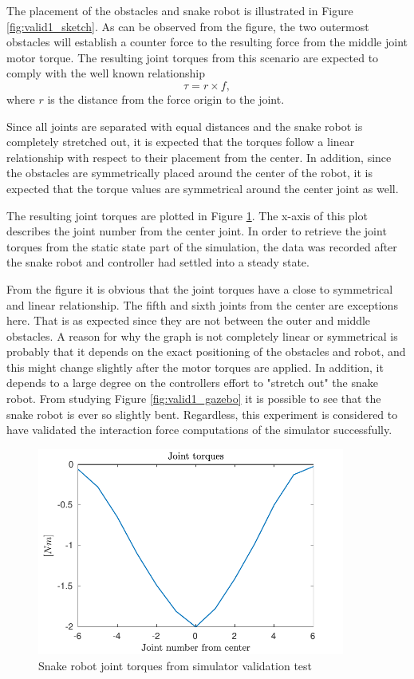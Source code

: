 The placement of the obstacles and snake robot is illustrated in Figure \ref{fig:valid1_sketch}. As can be observed from the figure, the two outermost obstacles will establish a counter force to the resulting force from the middle joint motor torque. The resulting joint torques from this scenario are expected to comply with the well known relationship
\begin{equation}
    \tau = r\times f,
\end{equation}
where $r$ is the distance from the force origin to the joint.

Since all joints are separated with equal distances and the snake robot is completely stretched out, it is expected that the torques follow a linear relationship with respect to their placement from the center. In addition, since the obstacles are symmetrically placed around the center of the robot, it is expected that the torque values are symmetrical around the center joint as well.

The resulting joint torques are plotted in Figure \ref{fig:validation1}. The x-axis of this plot describes the joint number from the center joint. In order to retrieve the joint torques from the static state part of the simulation, the data was recorded after the snake robot and controller had settled into a steady state.

From the figure it is obvious that the joint torques have a close to symmetrical and linear relationship. The fifth and sixth joints from the center are exceptions here. That is as expected since they are not between the outer and middle obstacles. A reason for why the graph is not completely linear or symmetrical is probably that it depends on the exact positioning of the obstacles and robot, and this might change slightly after the motor torques are applied. In addition, it depends to a large degree on the controllers effort to "stretch out" the snake robot. From studying Figure \ref{fig:valid1_gazebo} it is possible to see that the snake robot is ever so slightly bent.
Regardless, this experiment is considered to have validated the interaction force computations of the simulator successfully. 

\begin{figure}[h!]
    \centering
    \includegraphics[width=0.9\textwidth]{figures/experiments/validation1.pdf}
    \caption{Snake robot joint torques from simulator validation test}
    \label{fig:validation1}
\end{figure}


